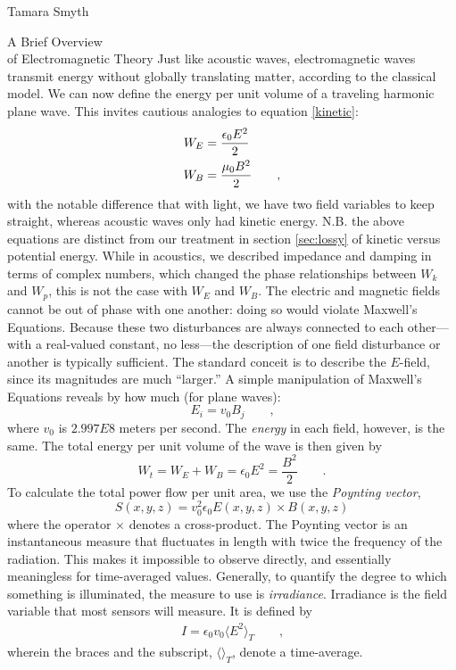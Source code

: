 \documentclass[a4paper,10pt]{report}
\numberwithin{equation}{section}
\begin{document}
\begin{chapter}{Tamara Smyth}
\begin{section}{A Brief Overview \\of Electromagnetic Theory}
Just like acoustic waves, electromagnetic waves transmit energy without globally translating matter, according to the classical model. We can now define the energy per unit volume of a traveling harmonic plane wave. This invites cautious analogies to equation \eqref{kinetic}:
\begin{align}\label{em_energy}
W_E &= \frac{\epsilon_0 E^2}{2}\notag\\
W_B &= \frac{\mu_0 B^2}{2}\qquad \text{,}
\end{align}
with the notable difference that with light, we have two field variables to keep straight, whereas acoustic waves only had kinetic energy. N.B. the above equations are distinct from our treatment in section \ref{sec:lossy} of kinetic versus potential energy. While in acoustics, we described impedance and damping in terms of complex numbers, which changed the phase relationships between $W_k$ and $W_p$, this is not the case with $W_E$ and $W_B$. The electric and magnetic fields cannot be out of phase with one another: doing so would violate Maxwell's Equations. \cite[p.~46]{Hecht1987} Because these two disturbances are always connected to each other---with a real-valued constant, no less---the description of one field disturbance or another is typically sufficient. The standard conceit is to describe the $E$-field, since its magnitudes are much ``larger.'' A simple manipulation of Maxwell's Equations reveals by how much  (for plane waves): \cite[p.~45]{Hecht1987}
\begin{equation}\label{EvB}
E_i = v_0 B_j \qquad \text{,}
\end{equation}
where $v_0$ is $2.997E8$ meters per second. The \emph{energy} in each field, however, is the same. The total energy per unit volume of the wave is then given by \cite[p.~46]{Hecht1987} 
\begin{equation}\label{emEtotal}
W_t = W_E + W_B = \epsilon_0 E^2 = \frac{B^2}{2} \qquad \text{.}
\end{equation}
To calculate the total power flow per unit area, we use the \emph{Poynting vector}, 
\begin{equation}\label{poynting}
S(x,y,z) = v_0^2 \epsilon_0 E(x,y,z) \times B(x,y,z)
\end{equation}
where the operator $\times$ denotes a cross-product. \cite[p.~46]{Hecht1987} The Poynting vector is an instantaneous measure that fluctuates in length with twice the frequency of the radiation. This makes it impossible to observe directly, and essentially meaningless for time-averaged values. Generally, to quantify the degree to which something is illuminated, the measure to use is \emph{irradiance}. Irradiance is the field variable that most sensors will measure. It is defined by
\begin{align}\label{irradiance}
I = \epsilon_0 v_0 \langle E^2 \rangle_T \qquad \text{,}
\end{align}
wherein the braces and the subscript, $\langle \rangle_T$, denote a time-average. \cite[p.~48]{Hecht1987}


\end{section}
\end{chapter}
\end{document}
